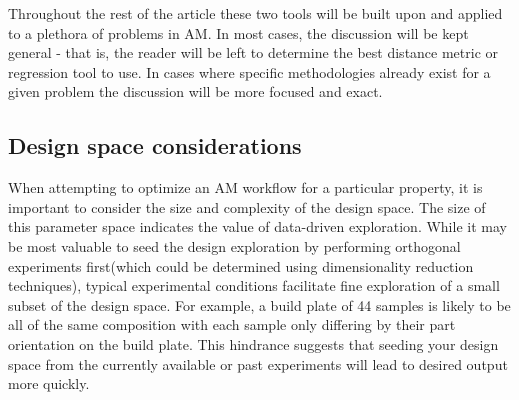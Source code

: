 Throughout the rest of the article these two tools will be built upon and applied to a plethora of problems in AM.
In most cases, the discussion will be kept general - that is, the reader will be left to determine the best distance metric or regression tool to use.
In cases where specific methodologies already exist for a given problem the discussion will be more focused and exact.

\subsection{Design space considerations}
\label{subsec:DMC_design_space}
When attempting to optimize an AM workflow for a particular property, it is important to consider the size and complexity of the design space.
The size of this parameter space indicates the value of data-driven exploration.
While it may be most valuable to seed the design exploration by performing orthogonal experiments first(which could be determined using dimensionality reduction techniques), typical experimental conditions facilitate fine exploration of a small subset of the design space.
For example, a build plate of 44 samples is likely to be all of the same composition with each sample only differing by their part orientation on the build plate.
This hindrance suggests that seeding your design space from the currently available or past experiments will lead to desired output more quickly.


